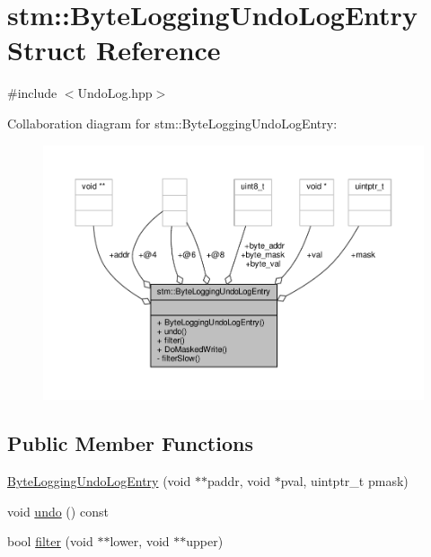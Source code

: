 \hypertarget{structstm_1_1ByteLoggingUndoLogEntry}{\section{stm\-:\-:Byte\-Logging\-Undo\-Log\-Entry Struct Reference}
\label{structstm_1_1ByteLoggingUndoLogEntry}
}


{\ttfamily \#include $<$Undo\-Log.\-hpp$>$}



Collaboration diagram for stm\-:\-:Byte\-Logging\-Undo\-Log\-Entry\-:
\nopagebreak
\begin{figure}[H]
\begin{center}
\leavevmode
\includegraphics[width=350pt]{structstm_1_1ByteLoggingUndoLogEntry__coll__graph}
\end{center}
\end{figure}
\subsection*{Public Member Functions}
\begin{DoxyCompactItemize}
\item 
\hyperlink{structstm_1_1ByteLoggingUndoLogEntry_a6d503a1bbaefc626ab2a486cec253d42}{Byte\-Logging\-Undo\-Log\-Entry} (void $\ast$$\ast$paddr, void $\ast$pval, uintptr\-\_\-t pmask)
\item 
void \hyperlink{structstm_1_1ByteLoggingUndoLogEntry_ac24d57954b9236718f77912d5fbc47e3}{undo} () const 
\item 
bool \hyperlink{structstm_1_1ByteLoggingUndoLogEntry_a7c154c57183d3845c6ac425124a34530}{filter} (void $\ast$$\ast$lower, void $\ast$$\ast$upper)
\end{DoxyCompactItemize}
